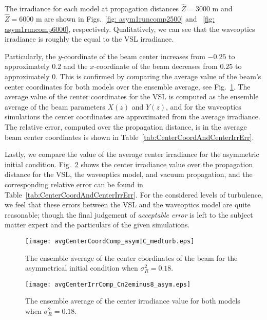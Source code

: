 \documentclass[9pt,twocolumn,twoside]{osajnl}
\begin{document}
The irradiance for each model at propagation distances $\widehat{Z} = 3000$ m 
and $\widehat{Z}=6000$ m are shown in Figs.~\ref{fig: asym1runcomp2500} and 
~\ref{fig: asym1runcomp6000}, respectively. 
Qualitatively, we can see that the waveoptics irradiance is roughly the equal 
to the VSL irradiance.


Particularly, the $y$-coordinate of the beam center increases from $-0.25$ to approximately $0.2$ and the $x$-coordinate of the beam decreases from $0.25$ to approximately $0$.
This is confirmed by comparing the average value of the beam's center coordinates for both models over the ensemble average, see Fig.~\ref{fig:centercoord_asym}.
The average value of the center coordinates for the VSL is computed as the ensemble average of the beam parameters $X(z)$ and $Y(z)$, and for the waveoptics simulations the center coordinates are approximated from the average irradiance. The relative error, computed over the propagation distance, is in the average beam center coordinates is shown in Table~\ref{tab:CenterCoordAndCenterIrrErr}.

Lastly, we compare the value of the average center irradiance for the asymmetric initial condition. 
 Fig.~\ref{fig:centerirr_asym} shows the center irradiance value over the propagation distance for the VSL, the waveoptics model, and vacuum propagation, and the corresponding relative error can be found in Table~\ref{tab:CenterCoordAndCenterIrrErr}.
For the considered levels of turbulence, we feel that these errors between the VSL and the waveoptics model are quite reasonable; though the final judgement of {\em acceptable error} is left to the subject matter expert and the particulars of the given simulations.


\begin{figure}[t]
    \centering
    \texttt{[image: avgCenterCoordComp\_asymIC\_medturb.eps]}
    \caption{The ensemble average of the center coordinates of the beam for the asymmetrical initial condition when $\sigma_{R}^2 = 0.18$. }
    \label{fig:centercoord_asym} \vspace*{-3mm}
\end{figure}

\begin{figure}[t]
    \centering
    \texttt{[image: avgCenterIrrComp\_Cn2eminus8\_asym.eps]}
    \caption{The ensemble average of the center irradiance value for both models when $\sigma_{R}^2 = 0.18$.}
    \label{fig:centerirr_asym} \vspace*{-3mm}
\end{figure}
\end{document}
